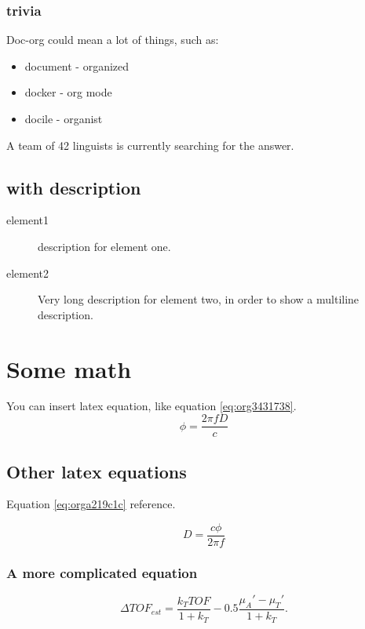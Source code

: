 \documentclass[11pt]{article}
\begin{document}
\subsubsection{trivia}
\label{sec:org4d966c9}
Doc-org could mean a lot of things, such as:
\begin{itemize}
\item document - organized
\item docker - org mode
\item docile - organist
\end{itemize}
A team of 42 linguists is currently searching for the answer.
\subsection{with description}
\label{sec:org455f081}
\begin{description}
\item[{element1}] description for element one.
\item[{element2}] Very long description for element two, in order to show a
multiline description.
\end{description}

\section{Some math}
\label{sec:org1937ef9}
You can insert latex equation, like equation \ref{eq:org3431738}.
\begin{equation}
\label{eq:org3431738}
\phi = \frac{2\pi fD}{c}
\end{equation}
\subsection{Other latex equations}
\label{sec:orgdcdced0}
Equation \ref{eq:orga219c1c} reference.

\begin{equation}
\label{eq:orga219c1c}
D = \frac{c\phi}{2\pi f}
\end{equation}

\subsubsection{A more complicated equation}
\label{sec:org4b33d3f}

\begin{equation}
\Delta TOF_{est} = \frac{k_T TOF}{1+k_T } - 0.5 \frac{\mu_A' - \mu_T'}{1+k_T}.
\end{equation}
\end{document}
